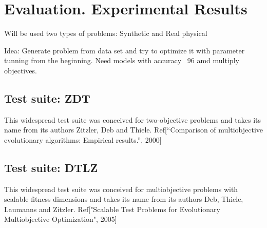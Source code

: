 \chapter{Evaluation. Experimental Results} 

\cite{kouwe2018benchmarking}

Will be used two types of problems: Synthetic and Real physical

Idea: Generate problem from data set and try to optimize it with parameter tunning from the beginning. 
Need models with accuracy ~96 amd multiply objectives. 

\section{Test suite: ZDT}
This widespread test suite was conceived for two-objective problems and takes its name from its authors Zitzler, Deb and Thiele.
Ref[“Comparison of multiobjective evolutionary algorithms: Empirical results.”, 2000]

\section{Test suite: DTLZ}
This widespread test suite was conceived for multiobjective problems with scalable fitness dimensions and takes its name from its authors Deb, Thiele, Laumanns and Zitzler.
Ref["Scalable Test Problems for Evolutionary Multiobjective Optimization", 2005]

